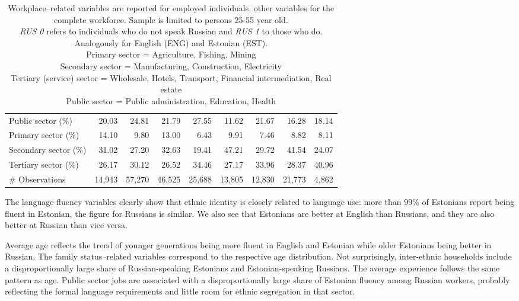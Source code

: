 \documentclass[12pt, a4paper]{article}
\begin{document}
\begin{table}
\begin{tabular}{l|rrrr|rrrr}
		Public sector (\%)     & 20.03 & 24.81 & 21.79 & 27.55 & 11.62 & 21.67 & 16.28 & 18.14 \\
		Primary sector (\%)     & 14.10 & 9.80  & 13.00 & 6.43  & 9.91  & 7.46  & 8.82  & 8.11  \\
		Secondary sector (\%)    & 31.02 & 27.20 & 32.63 & 19.41 & 47.21 & 29.72 & 41.54 & 24.07 \\
		Tertiary sector (\%)    & 26.17 & 30.12 & 26.52 & 34.46 & 27.17 & 33.96 & 28.37 & 40.96 \\
		\# Observations       & 14,943 & 57,270 & 46,525 & 25,688 & 13,805 & 12,830 & 21,773 & 4,862 \\ \bottomrule
	\end{tabular}%
	\label{tab:descriptive}%
                             
                           
	\caption*{\small
				Workplace--related variables are reported for employed individuals,
			other variables for the complete workforce. Sample is limited to persons
			25-55 year old.\\
			\emph{RUS 0} refers to individuals who do not speak Russian and
			\emph{RUS 1} to those who do. Analogously for  
			English
			(ENG) and
			Estonian (EST).\\
			Primary sector = Agriculture,
			Fishing, Mining \\ Secondary sector = Manufacturing,
			Construction, Electricity \\ Tertiary (service) sector =
			Wholesale, Hotels, Transport, Financial intermediation, Real
			estate \\ Public sector = Public administration, Education,
			Health
		}
\end{table}%

The language fluency variables clearly show that ethnic identity is
closely related to language use: more than 99\% of Estonians report
being fluent in Estonian, the figure for Russians is similar. We
also see that Estonians are better at English than Russians, and they
are also better at Russian than vice versa.

Average age reflects the trend of younger generations
being more fluent in English and Estonian while older Estonians being
better in Russian. The family status--related variables correspond to the
respective age distribution. Not surprisingly, inter-ethnic
households include a disproportionally large share of Russian-speaking
Estonians and Estonian-speaking Russians.
The average experience follows the same pattern as age.
Public sector jobs are associated with a disproportionally large share of
Estonian fluency among Russian workers, probably reflecting the formal
language requirements and little room for ethnic segregation in that
sector.
\end{document}

